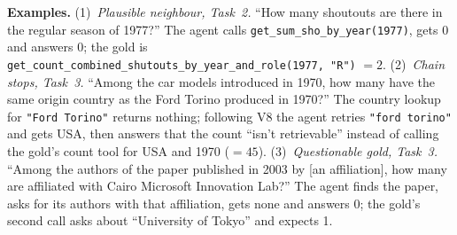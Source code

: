 \documentclass[10pt]{article}
\begin{document}
\textbf{Examples.} (1)~\emph{Plausible neighbour, Task~2.} ``How many shoutouts are there in the
regular season of 1977?'' The agent calls \texttt{get\_sum\_sho\_by\_year(1977)}, gets 0 and answers
0; the gold is \texttt{get\_count\_combined\_shutouts\_\allowbreak by\_year\_and\_role(1977, "R")} $=2$.
(2)~\emph{Chain stops, Task~3.} ``Among the car models introduced in 1970, how many have the same
origin country as the Ford Torino produced in 1970?'' The country lookup for \texttt{"Ford Torino"}
returns nothing; following V8 the agent retries \texttt{"ford torino"} and gets USA, then answers that the count ``isn't retrievable'' instead of calling the gold's count tool for
USA and 1970 ($=45$). (3)~\emph{Questionable
gold, Task~3.} ``Among the authors of the paper published in 2003 by [an affiliation], how many are
affiliated with Cairo Microsoft Innovation Lab?'' The agent finds the paper, asks for its authors
with that affiliation, gets none and answers 0; the gold's second call asks about
``University of Tokyo'' and expects 1.
\end{document}
